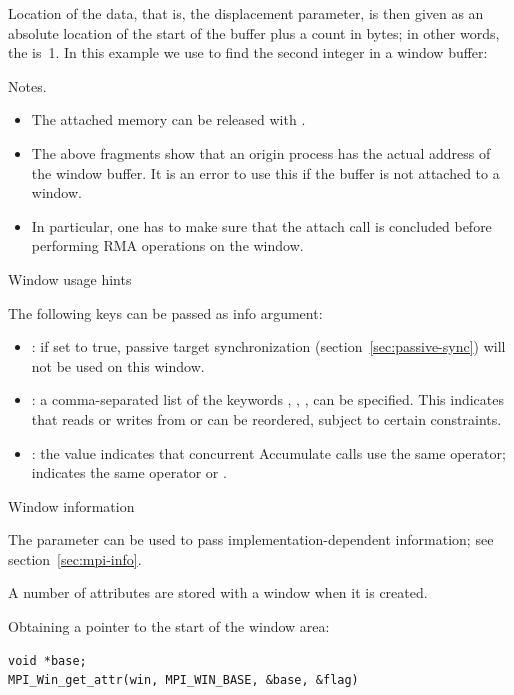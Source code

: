 Location of the data, that is, the displacement parameter,
is then given as an absolute location
of the start of the buffer plus a count in bytes;
in other words, the  is~1.
In this example we use  to find the second
integer in a window buffer:
%

Notes.
\begin{itemize}
\item 
  The attached memory can be released with
  .
\item The above fragments show that an origin process has the actual
  address of the window buffer. It is an error to use this if the
  buffer is not attached to a window.
\item In particular, one has to make sure that the attach call is
  concluded before performing \ac{RMA} operations on the window.
\end{itemize}

 {Window usage hints}
\label{sec:window-info}

The following keys can be passed as info argument:
\begin{itemize}
\item {}: if set to true, passive target synchronization
  (section~\ref{sec:passive-sync}) will not be used on this window.
\item {}: a comma-separated list of
  the keywords , ,
  ,  can be specified. This
  indicates that reads or writes from  or
   can be reordered, subject to
  certain constraints.
\item {}: the value 
  indicates that concurrent Accumulate calls use the same operator;
   indicates the same operator or
  .
\end{itemize}

 {Window information}
\label{sec:win-attr}

The  parameter can be used to pass implementation-dependent 
information; see section~\ref{sec:mpi-info}.

A number of attributes are stored with a window when it is created.

Obtaining a pointer to the start of the window area:
\begin{lstlisting}
void *base;
MPI_Win_get_attr(win, MPI_WIN_BASE, &base, &flag)  
\end{lstlisting}

